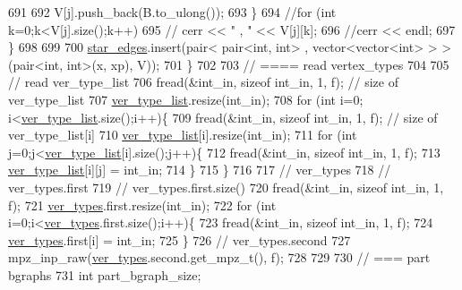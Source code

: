 \begin{DoxyCode}
691 
692         V[j].push\_back(B.to\_ulong());
693       \}
694       \textcolor{comment}{//for (int k=0;k<V[j].size();k++)}
695       \textcolor{comment}{//  cerr << " , " << V[j][k];}
696       \textcolor{comment}{//cerr << endl;}
697     \}
698 
699 
700     \hyperlink{classmarked__graph__compressed_a7df5779d313486644132bd816937f532}{star\_edges}.insert(pair< pair<int, int> , vector<vector<int> > > (pair<int, int>(x, xp), V));
701   \}
702 
703   \textcolor{comment}{// ==== read vertex\_types}
704 
705   \textcolor{comment}{// read ver\_type\_list}
706   fread(&int\_in, \textcolor{keyword}{sizeof} int\_in, 1, f); \textcolor{comment}{// size of ver\_type\_list}
707   \hyperlink{classmarked__graph__compressed_af2e3e55223d436628a02758dfae88493}{ver\_type\_list}.resize(int\_in);
708   \textcolor{keywordflow}{for} (\textcolor{keywordtype}{int} i=0; i<\hyperlink{classmarked__graph__compressed_af2e3e55223d436628a02758dfae88493}{ver\_type\_list}.size();i++)\{
709     fread(&int\_in, \textcolor{keyword}{sizeof} int\_in, 1, f); \textcolor{comment}{// size of ver\_type\_list[i]}
710     \hyperlink{classmarked__graph__compressed_af2e3e55223d436628a02758dfae88493}{ver\_type\_list}[i].resize(int\_in);
711     \textcolor{keywordflow}{for} (\textcolor{keywordtype}{int} j=0;j<\hyperlink{classmarked__graph__compressed_af2e3e55223d436628a02758dfae88493}{ver\_type\_list}[i].size();j++)\{
712       fread(&int\_in, \textcolor{keyword}{sizeof} int\_in, 1, f);
713       \hyperlink{classmarked__graph__compressed_af2e3e55223d436628a02758dfae88493}{ver\_type\_list}[i][j] = int\_in;
714     \}
715   \}
716 
717   \textcolor{comment}{// ver\_types}
718   \textcolor{comment}{// ver\_types.first}
719   \textcolor{comment}{// ver\_types.first.size()}
720   fread(&int\_in, \textcolor{keyword}{sizeof} int\_in, 1, f);
721   \hyperlink{classmarked__graph__compressed_af446cc5e23c241a92b76642fd5ebc403}{ver\_types}.first.resize(int\_in);
722   \textcolor{keywordflow}{for} (\textcolor{keywordtype}{int} i=0;i<\hyperlink{classmarked__graph__compressed_af446cc5e23c241a92b76642fd5ebc403}{ver\_types}.first.size();i++)\{
723     fread(&int\_in, \textcolor{keyword}{sizeof} int\_in, 1, f);
724     \hyperlink{classmarked__graph__compressed_af446cc5e23c241a92b76642fd5ebc403}{ver\_types}.first[i] = int\_in;
725   \}
726   \textcolor{comment}{// ver\_types.second}
727   mpz\_inp\_raw(\hyperlink{classmarked__graph__compressed_af446cc5e23c241a92b76642fd5ebc403}{ver\_types}.second.get\_mpz\_t(), f);
728 
729 
730   \textcolor{comment}{// === part bgraphs}
731   \textcolor{keywordtype}{int} part\_bgraph\_size;

\end{DoxyCode}
